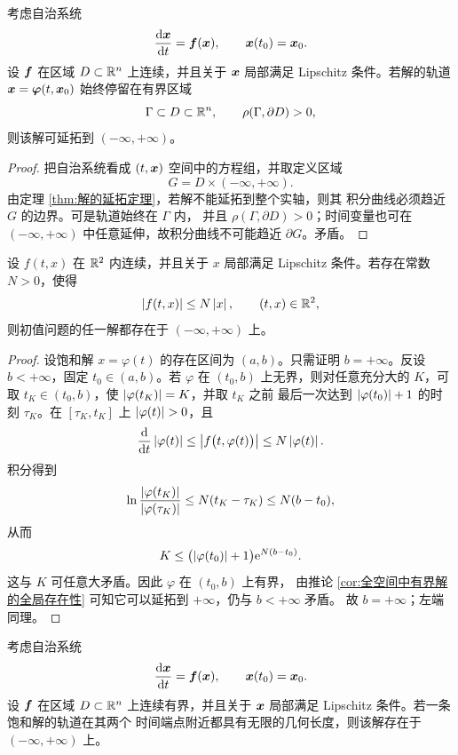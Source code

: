 \begin{theorem}[自治系统的有界内陷区域]\label{thm:自治系统的有界内陷区域}
	考虑自治系统
	\[
		\dfrac{\mathrm{d}\boldsymbol{x}}{\mathrm{d} t}=\boldsymbol{f}(\boldsymbol{x}),
		\qquad
		\boldsymbol{x}(t_0)=\boldsymbol{x}_0.
	\]
	设 $\boldsymbol{f}$ 在区域 $D\subset\mathbb{R}^n$ 上连续，并且关于
	$\boldsymbol{x}$ 局部满足 Lipschitz 条件。若解的轨道
	$\boldsymbol{x}=\boldsymbol{\varphi}(t,\boldsymbol{x}_0)$ 始终停留在有界区域
	\[
		\Gamma\subset D\subset\mathbb{R}^n,
		\qquad
		\rho(\Gamma,\partial D)>0,
	\]
	则该解可延拓到 $(-\infty,+\infty)$。
\end{theorem}

\begin{proof}
	把自治系统看成 $(t,\boldsymbol{x})$ 空间中的方程组，并取定义区域
	\[
		G=D\times(-\infty,+\infty).
	\]
	由定理 \ref{thm:解的延拓定理}，若解不能延拓到整个实轴，则其
	积分曲线必须趋近 $G$ 的边界。可是轨道始终在 $\Gamma$ 内，
	并且 $\rho(\Gamma,\partial D)>0$；时间变量也可在
	$(-\infty,+\infty)$ 中任意延伸，故积分曲线不可能趋近
	$\partial G$。矛盾。
\end{proof}

\begin{theorem}[线性增长条件下的全局存在性]
	\label{cor:线性增长条件下的全区间存在性}
	设 $f(t,x)$ 在 $\mathbb{R}^2$ 内连续，并且关于 $x$ 局部满足 Lipschitz
	条件。若存在常数 $N>0$，使得
	\[
		\left| f(t,x) \right|\leq N\left| x \right|,
		\qquad (t,x)\in\mathbb{R}^2,
	\]
	则初值问题的任一解都存在于 $(-\infty,+\infty)$ 上。
\end{theorem}

\begin{proof}
	设饱和解 $x=\varphi(t)$ 的存在区间为 $(a,b)$。只需证明
	$b=+\infty$。反设 $b<+\infty$，固定 $t_0\in(a,b)$。若 $\varphi$ 在
	$(t_0,b)$ 上无界，则对任意充分大的 $K$，可取
	$t_K\in(t_0,b)$，使 $\left| \varphi(t_K) \right|=K$，并取 $t_K$ 之前
	最后一次达到 $\left| \varphi(t_0) \right|+1$ 的时刻 $\tau_K$。在
	$[\tau_K,t_K]$ 上 $\abs{\varphi(t)}>0$，且
	\[
		\dfrac{\mathrm{d}}{\mathrm{d} t}\left| \varphi(t) \right|
		\leq\left| f\bigl(t,\varphi(t)\bigr) \right|
		\leq N\left| \varphi(t) \right|.
	\]
	积分得到
	\[
		\ln\dfrac{\left| \varphi(t_K) \right|}{\left| \varphi(\tau_K) \right|}
		\leq N(t_K-\tau_K)
		\leq N(b-t_0),
	\]
	从而
	\[
		K\leq
		\bigl(\left| \varphi(t_0) \right|+1\bigr)\mathrm{e}^{N(b-t_0)}.
	\]
	这与 $K$ 可任意大矛盾。因此 $\varphi$ 在 $(t_0,b)$ 上有界，
	由推论 \ref{cor:全空间中有界解的全局存在性} 可知它可以延拓到
	$+\infty$，仍与 $b<+\infty$ 矛盾。
	故 $b=+\infty$；左端同理。
\end{proof}

\begin{corollary}[有界向量场下的延拓]
	\label{cor:有界向量场下的延拓}
	考虑自治系统
	\[
		\dfrac{\mathrm{d}\boldsymbol{x}}{\mathrm{d} t}=\boldsymbol{f}(\boldsymbol{x}),
		\qquad
		\boldsymbol{x}(t_0)=\boldsymbol{x}_0.
	\]
	设 $\boldsymbol{f}$ 在区域 $D\subset\mathbb{R}^n$ 上连续有界，并且关于
	$\boldsymbol{x}$ 局部满足 Lipschitz 条件。若一条饱和解的轨道在其两个
	时间端点附近都具有无限的几何长度，则该解存在于
	$(-\infty,+\infty)$ 上。
\end{corollary}

